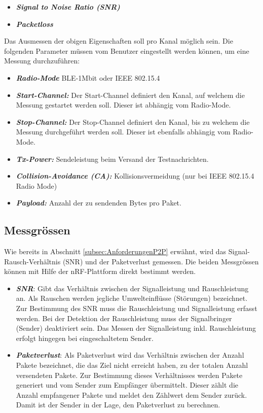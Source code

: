 \begin{itemize}
	\item \textit{\textbf{Signal to Noise Ratio (SNR)}}
	\item \textit{\textbf{Packetloss}}
\end{itemize}

Das Ausmessen der obigen Eigenschaften soll pro Kanal möglich sein. Die folgenden Parameter müssen vom Benutzer eingestellt werden können, um eine Messung durchzuführen:

\begin{itemize}
	\item \textit{\textbf{Radio-Mode}} BLE-1Mbit oder IEEE 802.15.4
	\item \textit{\textbf{Start-Channel:}} Der Start-Channel definiert den Kanal, auf welchem die Messung gestartet werden soll. Dieser ist abhängig vom Radio-Mode.
	\item \textit{\textbf{Stop-Channel:}} Der Stop-Channel definiert den Kanal, bis zu welchem die Messung durchgeführt werden soll. Dieser ist ebenfalls abhängig vom Radio-Mode.
	\item \textit{\textbf{Tx-Power:}} Sendeleistung beim Versand der Testnachrichten.
	\item \textit{\textbf{Collision-Avoidance (CA):}} Kollisionsvermeidung (nur bei IEEE 802.15.4 Radio Mode)
	\item \textit{\textbf{Payload:}} Anzahl der zu sendenden Bytes pro Paket.
\end{itemize}


\subsection{Messgrössen}\label{subsec:MessgrössenP2P}
Wie bereits in Abschnitt \ref{subsec:AnforderungenP2P} erwähnt, wird das Signal-Rausch-Verhältnis (SNR) und der Paketverlust gemessen. Die beiden Messgrössen können mit Hilfe der nRF-Plattform direkt bestimmt werden.

\begin{itemize}
	\item \textbf{\textit{SNR}}: Gibt das Verhältnis zwischen der Signalleistung und Rauschleistung an. Als Rauschen werden jegliche Umwelteinflüsse (Störungen) bezeichnet. Zur Bestimmung des SNR muss die Rauschleistung und Signalleistung erfasst werden.
	Bei der Detektion der Rauschleistung muss der Signalbringer (Sender) deaktiviert sein. Das Messen der Signalleistung inkl. Rauschleistung erfolgt hingegen bei eingeschaltetem Sender.
	
	\item \textbf{\textit{Paketverlust}}: Als Paketverlust wird das Verhältnis zwischen der Anzahl Pakete bezeichnet, die das Ziel nicht erreicht haben, zu der totalen Anzahl versendeten Pakete.
	Zur Bestimmung dieses Verhältnisses werden Pakete generiert und vom Sender zum Empfänger übermittelt. Dieser zählt die Anzahl empfangener Pakete und meldet den Zählwert dem Sender zurück. Damit ist der Sender in der Lage, den Paketverlust zu berechnen. 
\end{itemize} 


